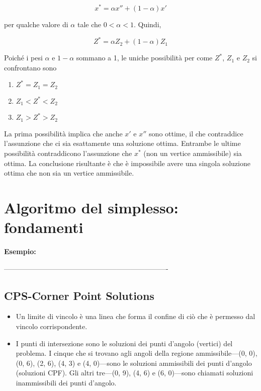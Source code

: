 \documentclass[a4paper, 11pt]{article}
\begin{document}
        $$
            x^* = \alpha x'' + (1 - \alpha) x'
        $$

        per qualche valore di $\alpha$ tale che $0 < \alpha < 1$. Quindi,

        $$
            Z^* = \alpha Z_2 + (1 - \alpha) Z_1
        $$

        Poiché i pesi $\alpha$ e $1 - \alpha$ sommano a 1, le uniche possibilità per come $Z^*$, $Z_1$ e $Z_2$ si confrontano sono

        \begin{enumerate}
            \item $Z^* = Z_1 = Z_2$
            \item $Z_1 < Z^* < Z_2$
            \item $Z_1 > Z^* > Z_2$
        \end{enumerate}

        La prima possibilità implica che anche $x'$ e $x''$ sono ottime, il che contraddice l'assunzione che ci sia esattamente una soluzione ottima. Entrambe le ultime possibilità contraddicono l'assunzione che $x^*$ (non un vertice ammissibile) sia ottima. La conclusione risultante è che è impossibile avere una singola soluzione ottima che non sia un vertice ammissibile.

       

    \section{Algoritmo del simplesso: fondamenti}
    \textbf{Esempio: }

    ----------------------------------------------------------------------
        
        \subsection{CPS-Corner Point Solutions}
        \begin{itemize}
            \item Un limite di vincolo è una linea che forma il confine di ciò che è permesso dal vincolo corrispondente.
            \item I punti di intersezione sono le soluzioni dei punti d'angolo (vertici) del problema. I cinque che si trovano agli angoli della regione ammissibile—(0, 0), (0, 6), (2, 6), (4, 3) e (4, 0)—sono le soluzioni ammissibili dei punti d'angolo (soluzioni CPF). Gli altri tre—(0, 9), (4, 6) e (6, 0)—sono chiamati soluzioni inammissibili dei punti d'angolo.
        \end{itemize}
        
\end{document}
